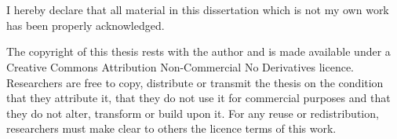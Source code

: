 
\chapter*{ }

\vspace*{-3cm}


\medskip

\noindent I hereby declare that all material in this dissertation which is not my own work has been properly acknowledged.

\vspace*{2cm}


\medskip

\noindent The copyright of this thesis rests with the author and is made available under a Creative Commons Attribution Non-Commercial No Derivatives licence. Researchers are free to copy, distribute or transmit the thesis on the condition that they attribute it, that they do not use it for commercial purposes and that they do not alter, transform or build upon it. For any reuse or redistribution, researchers must make clear to others the licence terms of this work.


